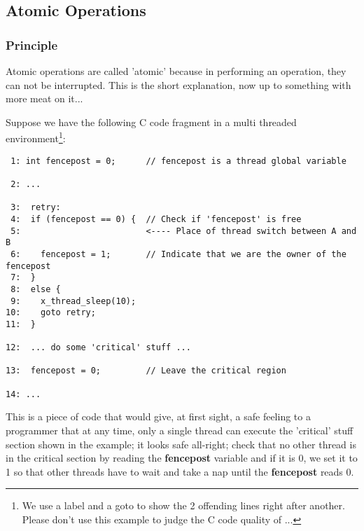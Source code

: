 %
%

\subsection{Atomic Operations}

\subsubsection{Principle}

Atomic operations are called 'atomic' because in performing an operation,
they can not be interrupted. This is the short explanation, now up to
something with more meat on it...

Suppose we have the following C code fragment
in a multi threaded environment\footnote{We use a label and a goto to show
the 2 offending lines right after another. Please don't use this example to
judge the C code quality of \oswald...}:

\bcode
\begin{verbatim}
 1: int fencepost = 0;      // fencepost is a thread global variable

 2: ...

 3:  retry:
 4:  if (fencepost == 0) {  // Check if 'fencepost' is free
 5:                         <---- Place of thread switch between A and B
 6:    fencepost = 1;       // Indicate that we are the owner of the fencepost
 7:  }
 8:  else {
 9:    x_thread_sleep(10);
10:    goto retry;
11:  }

12:  ... do some 'critical' stuff ...

13:  fencepost = 0;         // Leave the critical region

14: ...

\end{verbatim}
\ecode


This is a piece of code that would give, at first sight, a safe feeling to a
programmer that at any time, only a single thread can execute the 'critical' stuff
section shown in the example; it looks safe all-right; check that no other
thread is in the critical section by reading the \textbf{fencepost} variable and if
it is 0, we set it to 1 so that other threads have to wait and take a nap
until the \textbf{fencepost} reads 0.

